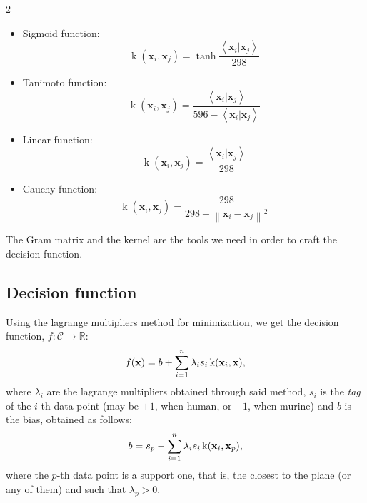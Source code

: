 \begin{multicols}{2}
\begin{itemize}
    \item Sigmoid function:
    \begin{equation*}
        \operatorname k(\textbf{x} _i,\textbf{x} _j)=\tanh \frac{
            \left\langle \textbf{x} _i| \textbf{x} _j \right\rangle
        }{
            298
        }
    \end{equation*}

    \item Tanimoto function:
    \begin{equation*}
        \operatorname k(\textbf{x} _i,\textbf{x} _j)=\frac{
            \left\langle \textbf{x} _i| \textbf{x} _j \right\rangle
        }{596 - \left\langle \textbf{x} _i| \textbf{x} _j \right\rangle}
    \end{equation*}
    
    \item Linear function: \begin{equation*}
        \operatorname k(\textbf{x} _i,\textbf{x} _j)=
        \frac{\left\langle \textbf{x} _i| \textbf{x} _j \right\rangle}{298}
    \end{equation*}

    \item Cauchy function:
    \begin{equation*}
        \operatorname k(\textbf{x} _i,\textbf{x} _j)=\frac{
            298
        }{298 + \left\| \textbf{x}_i-\textbf{x}_j   \right\|^2 }
    \end{equation*}
\end{itemize}
\end{multicols}

The Gram matrix and the kernel are the tools we need in order to craft the decision function.

\subsection{Decision function}

Using the lagrange multipliers method for minimization\futnotetext{}, we get the decision function, $f:\mathcal C\to\mathbb R$:
$$
f(\textbf x) = b + \sum_{i=1}^n\lambda_i s_i \operatorname k(\textbf x_i,\textbf x),
$$
where $\lambda_i$ are the lagrange multipliers obtained through said method, $s_i$ is the \textit{tag} of the $i$-th data point (may be $+1$, when human, or $-1$, when murine) and $b$ is the bias, obtained as follows:
$$
b=s_p-\sum_{i=1}^n \lambda_i s_i \operatorname k(\textbf x_i, \textbf x_p),
$$
where the $p$-th data point is a support one, that is, the closest to the plane (or any of them) and such that $\lambda_p>0$.


